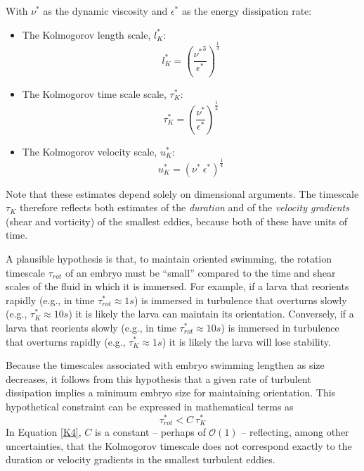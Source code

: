 \documentclass[10pt,a4paper]{article}
\begin{document}
With $\nu^*$ as the dynamic viscosity and $\epsilon^*$ as the energy dissipation rate:
\begin{itemize}
	\item The Kolmogorov length scale, $l_K^*$:
	\begin{equation}\label{K1}
		l_K^* = \left(\frac{{\nu^*}^3}{\epsilon^*}\right)^\frac{1}{4}
	\end{equation}
	\item The Kolmogorov time scale scale, $\tau_K^*$:
	\begin{equation}\label{K2}
		\tau_K^* = \left(\frac{\nu^*}{\epsilon^*}\right)^\frac{1}{2}
	\end{equation}
	\item The Kolmogorov velocity scale, $u_K^*$:
	\begin{equation}\label{K3}
		u_K^* = \left(\nu^* ~ \epsilon^* \right)^\frac{1}{4}
	\end{equation}
\end{itemize}
Note that these estimates depend solely on dimensional arguments.
The timescale $\tau_K$ therefore reflects both estimates of the \textit{duration} and of the \textit{velocity gradients} (shear and vorticity) of the smallest eddies, because both of these have units of time.

A plausible hypothesis is that, to maintain oriented swimming, the rotation timescale $\tau_{rot}$ of an embryo must be ``small'' compared to the time and shear scales of the fluid in which it is immersed. 
For example, if a larva that reorients rapidly (e.g., in time $\tau^*_{rot} \approx 1 s$) is immersed in turbulence that overturns slowly (e.g., $\tau^*_K \approx 10 s$) it is likely the larva can maintain its orientation.
Conversely, if a larva that reorients slowly (e.g., in time $\tau^*_{rot} \approx 10 s$) is immersed in turbulence that overturns rapidly (e.g., $\tau^*_K \approx 1 s$) it is likely the larva will lose stability.

Because the timescales associated with embryo swimming lengthen as size decreases, it follows from this hypothesis that a given rate of turbulent dissipation implies a minimum embryo size for maintaining orientation.
This hypothetical constraint can be expressed in mathematical terms as
\begin{equation}\label{K4}
	\tau_{rot}^* < C ~ \tau_K^*
\end{equation}
In Equation \ref{K4}, $C$ is a constant -- perhaps of $\mathcal{O}(1)$ -- reflecting, among other uncertainties, that the Kolmogorov timescale does not correspond exactly to the duration or velocity gradients in the smallest turbulent eddies. 
\end{document}
